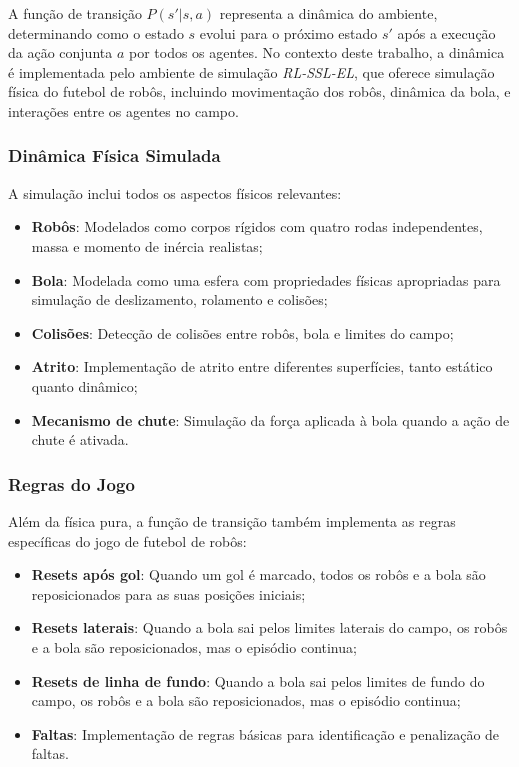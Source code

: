 A função de transição $P(s' | s, a)$ representa a dinâmica do ambiente, determinando como o estado $s$ evolui para o próximo estado $s'$ após a execução da ação conjunta $a$ por todos os agentes. No contexto deste trabalho, a dinâmica é implementada pelo ambiente de simulação \textit{RL-SSL-EL}, que oferece simulação física do futebol de robôs, incluindo movimentação dos robôs, dinâmica da bola, e interações entre os agentes no campo.

\subsubsection{Dinâmica Física Simulada}

A simulação inclui todos os aspectos físicos relevantes:

\begin{itemize}
    \item \textbf{Robôs}: Modelados como corpos rígidos com quatro rodas independentes, massa e momento de inércia realistas;
    \item \textbf{Bola}: Modelada como uma esfera com propriedades físicas apropriadas para simulação de deslizamento, rolamento e colisões;
    \item \textbf{Colisões}: Detecção de colisões entre robôs, bola e limites do campo;
    \item \textbf{Atrito}: Implementação de atrito entre diferentes superfícies, tanto estático quanto dinâmico;
    \item \textbf{Mecanismo de chute}: Simulação da força aplicada à bola quando a ação de chute é ativada.
\end{itemize}

\subsubsection{Regras do Jogo}

Além da física pura, a função de transição também implementa as regras específicas do jogo de futebol de robôs:

\begin{itemize}
    \item \textbf{Resets após gol}: Quando um gol é marcado, todos os robôs e a bola são reposicionados para as suas posições iniciais;
    \item \textbf{Resets laterais}: Quando a bola sai pelos limites laterais do campo, os robôs e a bola são reposicionados, mas o episódio continua;
    \item \textbf{Resets de linha de fundo}: Quando a bola sai pelos limites de fundo do campo, os robôs e a bola são reposicionados, mas o episódio continua;
    \item \textbf{Faltas}: Implementação de regras básicas para identificação e penalização de faltas.
\end{itemize}

